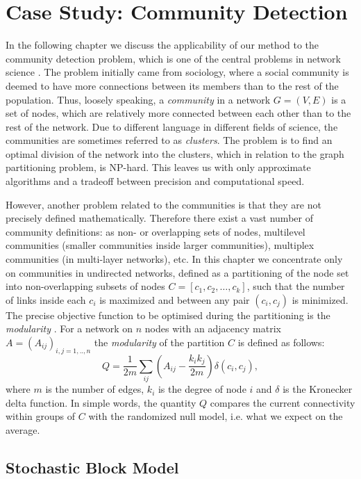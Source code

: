 \chapter{Case Study: Community Detection}\label{chap:2}
In the following chapter we discuss the applicability of our method to the community detection problem, which is one of the central problems in network science \cite{Fortunato2010}. The problem initially came from sociology, where a social community is deemed to have more connections between its members than to the rest of the population. Thus, loosely speaking, a \textit{community}  in a network $G=(V,E)$ is a set of nodes, which are relatively more connected between each other than to the rest of the network. Due to different language in different fields of science, the communities are sometimes referred to as \textit{clusters}. The problem is to find an optimal division of the network into the clusters, which in relation to the graph partitioning problem, is NP-hard. This leaves us with only approximate algorithms and a tradeoff between precision and computational speed.

However, another problem related to the communities is that they are not precisely defined mathematically. Therefore there exist a vast number of community definitions: as non- or overlapping sets of nodes, multilevel communities (smaller communities inside larger communities), multiplex communities (in multi-layer networks), etc. In this chapter we concentrate only on communities in undirected networks, defined as a partitioning of the node set into non-overlapping subsets of nodes $C=[c_1,c_2, \dots, c_k ]$, such that the number of links inside each $c_i$ is maximized and between any pair $(c_i, c_j)$ is minimized. The precise objective function to be optimised during the partitioning is the \textit{modularity} \cite{MN2}. For a network on $n$ nodes with an adjacency matrix $A = (A_{ij})_{i,j=1,..,n}$  the \textit{modularity} of the partition $C$ is defined as follows:
$$Q = \frac{1}{2m}\sum\limits_{ij}\left(A_{ij} - \frac{k_i k_j}{2m}\right)\delta(c_i,c_j),$$
where $m$ is the number of edges, $k_i$ is the degree of node $i$ and $\delta$ is the Kronecker delta function. In simple words, the quantity $Q$ compares the current connectivity within groups of $C$ with the randomized null model, i.e. what we expect on the average. 

\section{Stochastic Block Model}


